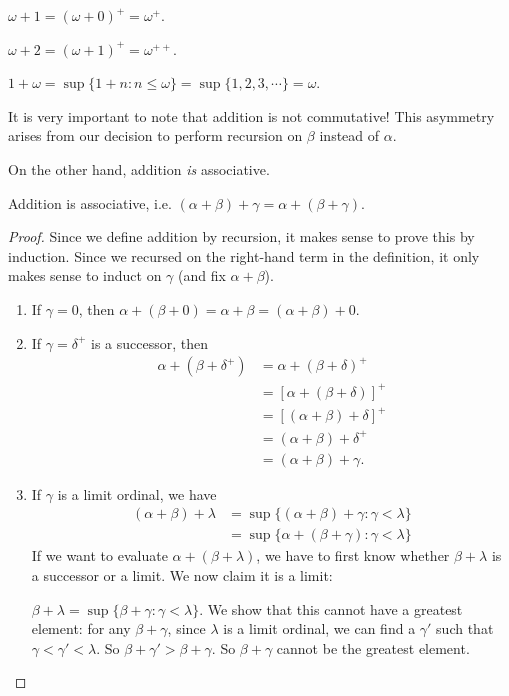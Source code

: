 \documentclass[a4paper]{article}
\begin{document}
\begin{eg}
  $\omega + 1 = (\omega + 0)^+ = \omega^+$.

  $\omega + 2 = (\omega + 1)^+ = \omega^{++}$.

  $1 + \omega = \sup\{ 1 + n: n \leq \omega\} = \sup\{1, 2, 3, \cdots\} = \omega$.
\end{eg}
It is very important to note that addition is not commutative! This asymmetry arises from our decision to perform recursion on $\beta$ instead of $\alpha$.

On the other hand, addition \emph{is} associative.
\begin{prop}
  Addition is associative, i.e. $(\alpha + \beta) + \gamma = \alpha + (\beta + \gamma)$.
\end{prop}

\begin{proof}
  Since we define addition by recursion, it makes sense to prove this by induction. Since we recursed on the right-hand term in the definition, it only makes sense to induct on $\gamma$ (and fix $\alpha + \beta$).

\begin{enumerate}
  \item If $\gamma = 0$, then $\alpha + (\beta + 0) = \alpha + \beta = (\alpha + \beta) + 0$.
  \item If $\gamma = \delta^+$ is a successor, then
    \begin{align*}
      \alpha + (\beta + \delta^+) &= \alpha + (\beta + \delta)^+\\
      &= [\alpha + (\beta + \delta)]^+\\
      &= [(\alpha + \beta) + \delta]^+\\
      &= (\alpha + \beta) + \delta^+\\
      &= (\alpha + \beta) + \gamma.
    \end{align*}
  \item If $\gamma$ is a limit ordinal, we have
    \begin{align*}
      (\alpha + \beta) + \lambda &= \sup\{(\alpha + \beta) + \gamma: \gamma < \lambda\}\\
      &= \sup\{\alpha + (\beta + \gamma): \gamma < \lambda\}
    \end{align*}
    If we want to evaluate $\alpha + (\beta + \lambda)$, we have to first know whether $\beta + \lambda$ is a successor or a limit. We now claim it is a limit:

    $\beta + \lambda = \sup\{\beta + \gamma: \gamma < \lambda\}$. We show that this cannot have a greatest element: for any $\beta + \gamma$, since $\lambda$ is a limit ordinal, we can find a $\gamma'$ such that $\gamma < \gamma' < \lambda$. So $\beta + \gamma' > \beta + \gamma$. So $\beta + \gamma$ cannot be the greatest element.


\end{enumerate}
\end{proof}
\end{document}
